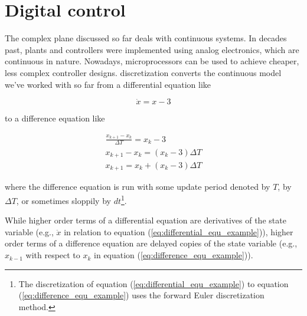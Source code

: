 
\chapter{Digital control} \label{ch:digital_control}

The complex plane discussed so far deals with continuous \glspl{system}. In
decades past, \glspl{plant} and controllers were implemented using analog
electronics, which are continuous in nature. Nowadays, microprocessors can be
used to achieve cheaper, less complex controller designs. \Gls{discretization}
converts the continuous \gls{model} we've worked with so far from a differential
equation like

\begin{equation}
  \dot{x} = x - 3 \label{eq:differential_equ_example}
\end{equation}

to a difference equation like

\begin{align}
  \frac{x_{k+1} - x_k}{\Delta T} = x_k - 3 \nonumber \\
  x_{k+1} - x_k = (x_k - 3) \Delta T \nonumber \\
  x_{k+1} = x_k + (x_k - 3) \Delta T \label{eq:difference_equ_example}
\end{align}

where the difference equation is run with some update period denoted by $T$, by
$\Delta T$, or sometimes sloppily by $dt$\footnote{The discretization of
equation (\ref{eq:differential_equ_example}) to equation
(\ref{eq:difference_equ_example}) uses the forward Euler discretization
method.}.

While higher order terms of a differential equation are derivatives of the
\gls{state} variable (e.g., $\ddot{x}$ in relation to equation
(\ref{eq:differential_equ_example})), higher order terms of a difference
equation are delayed copies of the \gls{state} variable (e.g., $x_{k-1}$ with
respect to $x_k$ in equation (\ref{eq:difference_equ_example})).

\renewcommand*{\chapterpath}{\partpath/digital-control}







